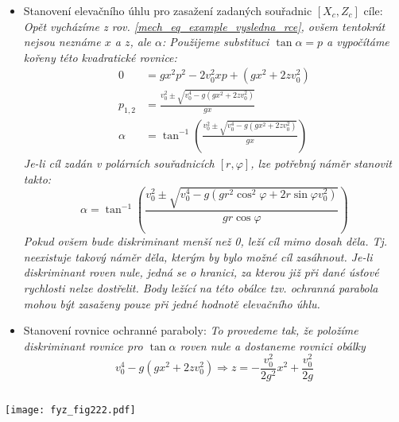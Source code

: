 \begin{example}
\begin{itemize}
    \item Stanovení elevačního úhlu pro zasažení zadaných souřadnic $[X_c, Z_c]$ cíle: \emph{Opět  
          vycházíme z rov. \ref{mech_eq_example_vysledna_rce}, ovšem tentokrát nejsou neznáme $x$ a 
          $z$, ale $\alpha$: Použijeme substituci $\tan\alpha=p$ a vypočítáme kořeny této 
          kvadratické rovnice:}
          \begin{align}
            0       &= gx^2p^2-2v_0^2xp+(gx^2+2zv_0^2) \\
            p_{1,2} &= \frac{v_0^2\pm\sqrt{v_0^4-g(gx^2+2zv_0^2)}}{gx} \\
            \alpha  &= \tan^{-1}\left(\frac{v_0^2\pm\sqrt{v_0^4-g(gx^2+2zv_0^2)}}{gx}\right)
          \end{align}
          \emph{Je-li cíl zadán v polárních souřadnicích $[r,\varphi]$, lze potřebný náměr stanovit takto:}
          \begin{equation*}
            \alpha=\tan^{-1}\left(\frac{v_0^2\pm
                   \sqrt{v_0^4-g(gr^2\cos^2\varphi+2r\sin\varphi
                         v_0^2)}}{gr\cos\varphi}\right)
          \end{equation*}
          \emph{Pokud ovšem bude diskriminant menší než 0, leží cíl mimo dosah děla. Tj. neexistuje 
          takový náměr děla, kterým by bylo možné cíl zasáhnout. Je-li diskriminant roven nule, 
          jedná se o hranici, za kterou již při dané úsťové rychlosti nelze dostřelit. Body ležící 
          na této obálce tzv. ochranná parabola mohou být zasaženy pouze při jedné hodnotě 
          elevačního úhlu.}

    \item Stanovení rovnice ochranné paraboly: \emph{To provedeme tak, že položíme diskriminant 	
          rovnice pro $\tan\alpha$ roven nule a dostaneme rovnici obálky}
          \begin{equation}\label{mech:eq_ochr_parabola}
            v_0^4-g(gx^2+2zv_0^2)\Rightarrow z=-\frac{v_0^2}{2g^2}x^2+\frac{v_0^2}{2g}
          \end{equation}
  \end{itemize}

  
  \begin{lstlisting}[caption=\texttt{kinematika\_delo\_ve\_vakuu.m} pro ověření výpočtu 
  balistické dráhy projektilu.]
  \end{lstlisting}
  {\centering
    \captionsetup{type=figure}
   \texttt{[image: fyz\_fig222.pdf]}
    \label{mech:fig_delo_matlab}
  \par}
\end{example}